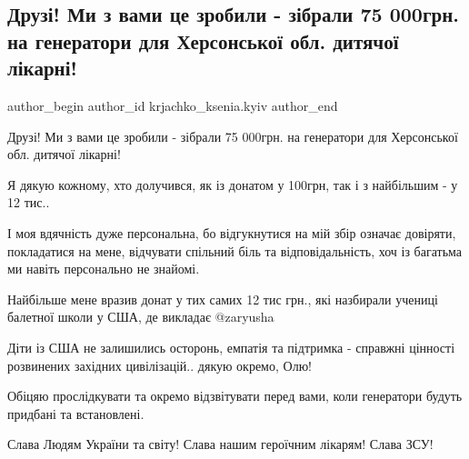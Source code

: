  
 
 
 
 

\subsection{Друзі! Ми з вами це зробили - зібрали 75 000грн. на генератори для Херсонської обл. дитячої лікарні!}
\label{sec:12_12_2022.fb.krjachko_ksenia.kyiv.1.druz__mi_z_vami_tse}

\ifcmt
 author_begin
   author_id krjachko_ksenia.kyiv
 author_end
\fi

Друзі! Ми з вами це зробили - зібрали 75 000грн. на генератори для Херсонської
обл. дитячої лікарні!

Я дякую кожному, хто долучився, як із донатом у 100грн, так і з найбільшим - у
12 тис.. 

І моя вдячність дуже персональна, бо відгукнутися на мій збір означає довіряти,
покладатися на мене, відчувати спільний біль та відповідальність, хоч із
багатьма ми навіть персонально не знайомі.

Найбільше мене вразив донат у тих самих 12 тис грн., які назбирали учениці
балетної школи у США, де викладає @zaryusha  

Діти із США не залишились осторонь, емпатія та підтримка - справжні цінності
розвинених західних цивілізацій.. дякую окремо, Олю! 

Обіцяю прослідкувати та окремо відзвітувати перед вами, коли генератори будуть
придбані та встановлені. 

Слава Людям України та світу! Слава нашим героїчним лікарям! Слава ЗСУ!
